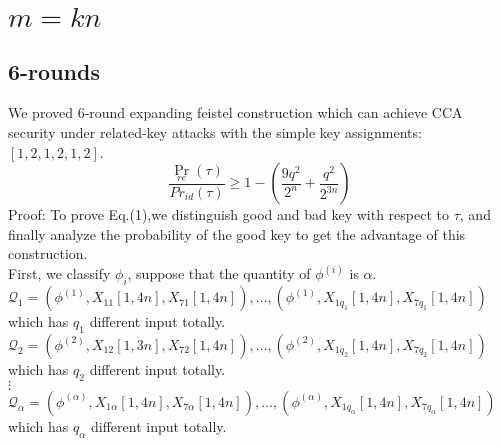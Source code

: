 \documentclass{article}
\begin{document}
\section{$m=kn$}
\subsection{6-rounds}
We proved 6-round expanding feistel construction which can achieve CCA security under related-key attacks with the simple key assignments:$[1,2,1,2,1,2]$.\\
\begin{equation}
\frac{\Pr_{re}(\tau)}{Pr_{id}(\tau)}\geq 1-(\frac{9q^{2}}{2^{n}}+\frac{q^{2}}{2^{3n}})
\end{equation}
Proof:
To prove Eq.(1),we distinguish good and bad key with respect to $\tau$, and finally analyze the probability of the good key to get the advantage of this construction.\\
First, we classify $\phi_{i}$, suppose that the quantity of $\phi^{(i)}$ is $\alpha$.\\
$\mathcal{Q}_{1}={(\phi^{(1)},X_{11}[1,4n],X_{71}[1,4n]),\dots,(\phi^{(1)},X_{1q_{1}}[1,4n],X_{7q_{1}}[1,4n])}$ which has $q_{1}$ different input totally.\\
$\mathcal{Q}_{2}={(\phi^{(2)},X_{12}[1,3n],X_{72}[1,4n]),\dots,(\phi^{(2)},X_{1q_{2}}[1,4n],X_{7q_{2}}[1,4n])}$    which has $q_{2}$ different input totally.\\
\quad \quad $\vdots$ \\
$\mathcal{Q}_{\alpha}={(\phi^{(\alpha)},X_{1\alpha}[1,4n],X_{7\alpha}[1,4n]),\dots,(\phi^{(\alpha)},X_{1q_{\alpha}}[1,4n],X_{7q_{\alpha}}[1,4n])}$ which has $q_{\alpha}$ different input totally.\\
\end{document}
